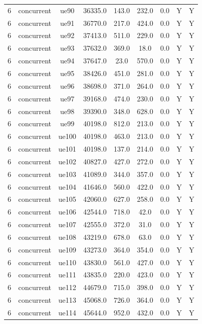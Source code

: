 \begin{table}[ht]
\begin{tabular}{|c|c|c|c|c|c|c|c|c|}
6 & concurrent & ue90 & 36335.0 & 143.0 & 232.0 & 0.0 & Y & Y \\
6 & concurrent & ue91 & 36770.0 & 217.0 & 424.0 & 0.0 & Y & Y \\
6 & concurrent & ue92 & 37413.0 & 511.0 & 229.0 & 0.0 & Y & Y \\
6 & concurrent & ue93 & 37632.0 & 369.0 & 18.0 & 0.0 & Y & Y \\
6 & concurrent & ue94 & 37647.0 & 23.0 & 570.0 & 0.0 & Y & Y \\
6 & concurrent & ue95 & 38426.0 & 451.0 & 281.0 & 0.0 & Y & Y \\
6 & concurrent & ue96 & 38698.0 & 371.0 & 264.0 & 0.0 & Y & Y \\
6 & concurrent & ue97 & 39168.0 & 474.0 & 230.0 & 0.0 & Y & Y \\
6 & concurrent & ue98 & 39390.0 & 348.0 & 628.0 & 0.0 & Y & Y \\
6 & concurrent & ue99 & 40198.0 & 812.0 & 213.0 & 0.0 & Y & Y \\
6 & concurrent & ue100 & 40198.0 & 463.0 & 213.0 & 0.0 & Y & Y \\
6 & concurrent & ue101 & 40198.0 & 137.0 & 214.0 & 0.0 & Y & Y \\
6 & concurrent & ue102 & 40827.0 & 427.0 & 272.0 & 0.0 & Y & Y \\
6 & concurrent & ue103 & 41089.0 & 344.0 & 357.0 & 0.0 & Y & Y \\
6 & concurrent & ue104 & 41646.0 & 560.0 & 422.0 & 0.0 & Y & Y \\
6 & concurrent & ue105 & 42060.0 & 627.0 & 258.0 & 0.0 & Y & Y \\
6 & concurrent & ue106 & 42544.0 & 718.0 & 42.0 & 0.0 & Y & Y \\
6 & concurrent & ue107 & 42555.0 & 372.0 & 31.0 & 0.0 & Y & Y \\
6 & concurrent & ue108 & 43219.0 & 678.0 & 63.0 & 0.0 & Y & Y \\
6 & concurrent & ue109 & 43273.0 & 364.0 & 354.0 & 0.0 & Y & Y \\
6 & concurrent & ue110 & 43830.0 & 561.0 & 427.0 & 0.0 & Y & Y \\
6 & concurrent & ue111 & 43835.0 & 220.0 & 423.0 & 0.0 & Y & Y \\
6 & concurrent & ue112 & 44679.0 & 715.0 & 398.0 & 0.0 & Y & Y \\
6 & concurrent & ue113 & 45068.0 & 726.0 & 364.0 & 0.0 & Y & Y \\
6 & concurrent & ue114 & 45644.0 & 952.0 & 432.0 & 0.0 & Y & Y \\

\end{tabular}
\end{table}
